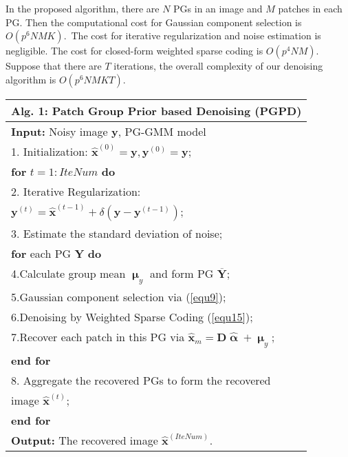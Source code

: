 In the proposed algorithm, there are $N$ PGs in an image and $M$ patches in each PG. Then the computational cost for Gaussian component selection is $O(p^{6}NMK)$.\ The cost for iterative regularization and noise estimation is negligible. The cost for closed-form weighted sparse coding is $O(p^{4}NM)$. Suppose that there are $T$ iterations, the overall complexity of our denoising algorithm is $O(p^{6}NMKT)$.
\vspace{-0.05in}
\begin{table}
\label{alg1}
\begin{tabular}{l}
\hline
\textbf{Alg. 1}: Patch Group Prior based Denoising (PGPD)
\\
\hline
\textbf{Input:} Noisy image $\mathbf{y}$, PG-GMM model
\\
1. Initialization: $\hat{\mathbf{x}}^{(0)}=\mathbf{y},\mathbf{y}^{(0)}=\mathbf{y}$;
\\
\textbf{for} $t = 1:IteNum$ \textbf{do}
\\
2. Iterative Regularization:
\\
\quad\quad\quad $\mathbf{y}^{(t)}=\hat{\mathbf{x}}^{(t-1)}+\delta(\mathbf{y}-\mathbf{y}^{(t-1)})$;
\\
3. Estimate the standard deviation of noise;
\\
\quad\textbf{for} each PG $\mathbf{Y}$ \textbf{do}
\\
4.\quad Calculate group mean $\boldsymbol{\upmu}_{y}$ and form PG $\mathbf{\overline{Y}}$;
\\
5.\quad Gaussian component selection via (\ref{equ9});
\\
6.\quad Denoising by Weighted Sparse Coding (\ref{equ15});
\\
7.\quad Recover each patch in this PG via $\hat{\mathbf{x}}_{m}=\mathbf{D}\hat{\boldsymbol{\upalpha}}+\boldsymbol{\upmu}_{y}$;
\\
\quad\textbf{end for}
\\
8. Aggregate the recovered PGs to form the recovered
\\
\quad image $\hat{\mathbf{x}}^{(t)}$;
\\
\textbf{end for}
\\
\textbf{Output:} The recovered image $\hat{\mathbf{x}}^{(IteNum)}$.\\
\hline
\end{tabular}\vspace{-0.15in}
\end{table}
